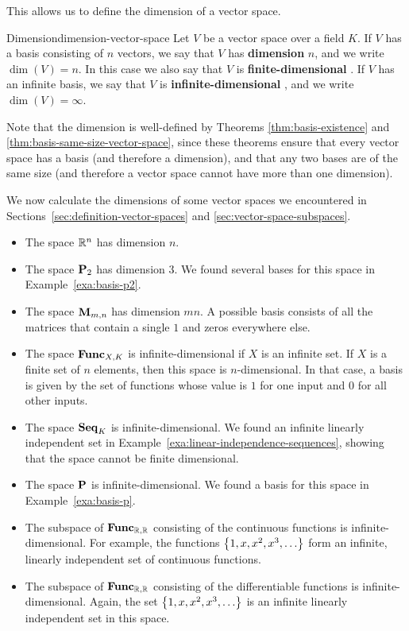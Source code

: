 This allows us to define the dimension of a vector space.

\begin{definition}{Dimension}{dimension-vector-space}
  Let $V$ be a vector space over a field $K$. If $V$ has a basis
  consisting of $n$ vectors, we say that $V$ has \textbf{dimension}%
   $n$, and we write $\dim(V)=n$. In
  this case we also say that $V$ is \textbf{finite-dimensional}%
  . If $V$ has an infinite
  basis, we say that $V$ is \textbf{infinite-dimensional}%
  , and we write $\dim(V) = \infty$.
\end{definition}

Note that the dimension is well-defined by Theorems
{\ref{thm:basis-existence}} and
{\ref{thm:basis-same-size-vector-space}}, since these theorems ensure
that every vector space has a basis (and therefore a dimension), and
that any two bases are of the same size (and therefore a vector space
cannot have more than one dimension).

We now calculate the dimensions of some vector spaces we encountered in
Sections~\ref{sec:definition-vector-spaces} and
{\ref{sec:vector-space-subspaces}}.

\begin{itemize}
\item The space $\mathbb{R}^n$ has dimension $n$.
\item The space $\mathbf{P}_2$ has dimension $3$. We found several bases
  for this space in Example~\ref{exa:basis-p2}.
\item The space $\mathbf{M}_{m,n}$ has dimension $mn$. A possible basis
  consists of all the matrices that contain a single $1$ and zeros
  everywhere else.
\item The space $\mathbf{Func}_{X,K}$ is infinite-dimensional if $X$ is an
  infinite set. If $X$ is a finite set of $n$ elements, then this
  space is $n$-dimensional. In that case, a basis is given by the set
  of functions whose value is $1$ for one input and $0$ for all other
  inputs.
\item The space $\mathbf{Seq}_K$ is infinite-dimensional. We found an infinite
  linearly independent set in
  Example~\ref{exa:linear-independence-sequences}, showing that the
  space cannot be finite dimensional.
\item The space $\mathbf{P}$ is infinite-dimensional. We found a basis for
  this space in Example~\ref{exa:basis-p}.
\item The subspace of $\mathbf{Func}_{\mathbb{R},\mathbb{R}}$ consisting of the continuous
  functions is infinite-dimensional. For example, the functions
  $\left\{1,x,x^2,x^3,\ldots\right\}$ form an infinite, linearly independent
  set of continuous functions.
\item The subspace of $\mathbf{Func}_{\mathbb{R},\mathbb{R}}$ consisting of the differentiable
  functions is infinite-dimensional. Again, the set
  $\left\{1,x,x^2,x^3,\ldots\right\}$ is an infinite linearly independent set
  in this space. 
\end{itemize}

